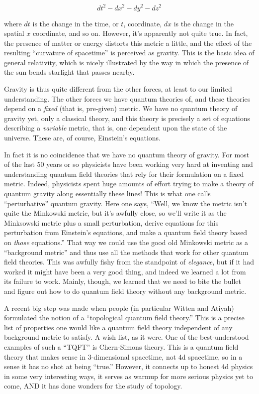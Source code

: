 \documentclass{article}
\begin{document}
\[dt^2 - dx^2 - dy^2 - dz^2\]

where \(dt\) is the change in the time, or \(t\), coordinate, \(dx\) is
the change in the spatial \(x\) coordinate, and so on. However, it's
apparently not quite true. In fact, the presence of matter or energy
distorts this metric a little, and the effect of the resulting
``curvature of spacetime'' is perceived as gravity. This is the basic
idea of general relativity, which is nicely illustrated by the way in
which the presence of the sun bends starlight that passes nearby.

Gravity is thus quite different from the other forces, at least to our
limited understanding. The other forces we have quantum theories of, and
these theories depend on a \emph{fixed} (that is, pre-given) metric. We
have no quantum theory of gravity yet, only a classical theory, and this
theory is precisely a set of equations describing a \emph{variable}
metric, that is, one dependent upon the state of the universe. These
are, of course, Einstein's equations.

In fact it is no coincidence that we have no quantum theory of gravity.
For most of the last 50 years or so physicists have been working very
hard at inventing and understanding quantum field theories that rely for
their formulation on a fixed metric. Indeed, physicists spent huge
amounts of effort trying to make a theory of quantum gravity along
essentially these lines! This is what one calls ``perturbative'' quantum
gravity. Here one says, ``Well, we know the metric isn't quite the
Minkowski metric, but it's awfully close, so we'll write it as the
Minksowski metric plus a small perturbation, derive equations for this
perturbation from Einstein's equations, and make a quantum field theory
based on \emph{those} equations.'' That way we could use the good old
Minkowski metric as a ``background metric'' and thus use all the methods
that work for other quantum field theories. This was awfully fishy from
the standpoint of \emph{elegance}, but if it had worked it might have
been a very good thing, and indeed we learned a lot from its failure to
work. Mainly, though, we learned that we need to bite the bullet and
figure out how to do quantum field theory without any background metric.

A recent big step was made when people (in particular Witten and Atiyah)
formulated the notion of a ``topological quantum field theory.'' This is
a precise list of properties one would like a quantum field theory
independent of any background metric to satisfy. A wish list, as it
were. One of the best-understood examples of such a ``TQFT'' is
Chern-Simons theory. This is a quantum field theory that makes sense in
3-dimensional spacetime, not 4d spacetime, so in a sense it has no shot
at being ``true.'' However, it connects up to honest 4d physics in some
very interesting ways, it serves as warmup for more serious physics yet
to come, AND it has done wonders for the study of topology.
\end{document}
